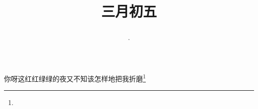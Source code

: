 \title{\date[d=13,m=4,y=2024][year:cn-y,年,month:cn,day:cn,日,·,weekday]·三月初五 }
你呀这红红绿绿的夜又不知该怎样地把我折磨\footnote{ }

